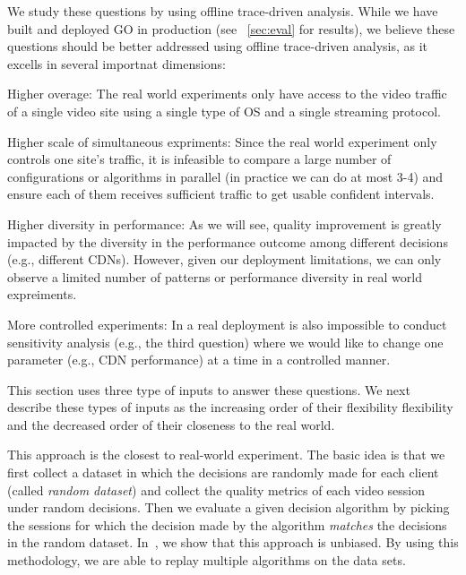 We study these questions by using offline trace-driven analysis. While we have built and deployed GO in production (see \Section~\ref{sec:eval} for results), we believe these questions should be better addressed using offline trace-driven analysis, as it excells in several importnat dimensions:
\begin{packedenumerate}
	\item Higher overage: The real world experiments only have access to the video traffic of a single video site using a single type of OS and a single streaming protocol. %
	\item Higher scale of simultaneous expriments: Since the real world experiment only controls one site's traffic, it is infeasible to compare a large number of configurations or algorithms in parallel (in practice we can do at most 3-4) and ensure each of them receives sufficient traffic to get usable confident intervals.
	\item Higher diversity in performance: As we will see, quality improvement is greatly impacted by the diversity in the performance outcome among different decisions (e.g., different CDNs). However, given our deployment limitations, we can only observe a limited number of patterns or performance diversity in real world expreiments.
	\item More controlled experiments: In a real deployment is also impossible to conduct sensitivity analysis (e.g., the third question) where we would like to change one parameter (e.g., CDN performance) at a time in a controlled manner.
\end{packedenumerate}


This section uses three type of inputs to answer these questions. We next describe these types of inputs as the increasing order of their flexibility flexibility and the decreased order of their closeness to the real world.

 This approach is the closest to
real-world experiment. The basic idea is that we first collect a
dataset in which the decisions are randomly made for each client
(called {\it random dataset}) and collect the quality metrics of each
video session under random decisions. Then we evaluate a given
decision algorithm by picking the sessions for which the decision made
by the algorithm \emph{matches} the decisions in the random
dataset. In~\cite{technicalreport}, we show that this approach is
unbiased.  By using this methodology, we are able to replay multiple
algorithms on the data sets.

